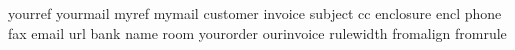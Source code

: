            {yourref}
          {yourmail}
             {myref}
            {mymail}
          {customer}
           {invoice}
           {subject}
                {cc}
         {enclosure}
              {encl}
             {phone}
               {fax}
             {email}
               {url}
              {bank}
              {name}
              {room}
         {yourorder}
        {ourinvoice}
         {rulewidth}
         {fromalign}
          {fromrule}
\stopinterface


